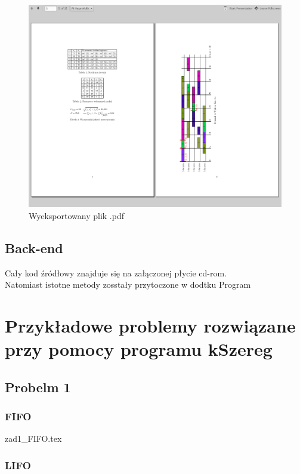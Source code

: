 \documentclass[twoside]{kInzynierka}
\begin{document}
\begin{figure}[htb]
    \centering
    \includegraphics[width=\textwidth, keepaspectratio=true]{./obrazki/pdf}
    \caption{Wyeksportowany plik .pdf}
\end{figure}

\subsection     {Back-end}
  Cały kod źródłowy znajduje się na załączonej płycie cd-rom. \\
Natomiast istotne metody  zosstały przytoczone w dodtku Program \\     
\section        [Przykładowe problemy \ldots]
                {Przykładowe problemy \newline rozwiązane przy pomocy programu kSzereg}
       
\subsection     {Probelm 1}
\subsubsection  {FIFO}
 {zad1_FIFO.tex}
\subsubsection  {LIFO}

\end{document}
